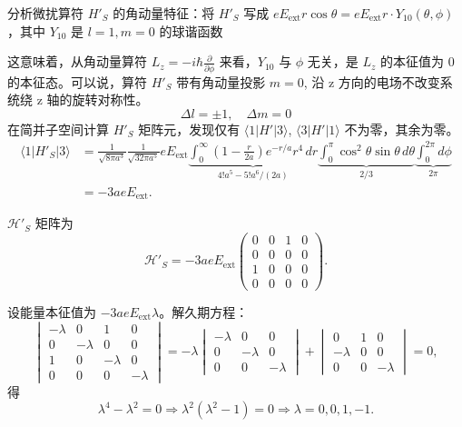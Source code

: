 分析微扰算符 \(H'_S\) 的角动量特征：将 \(H'_S\) 写成 \(eE_{\text{ext}} r \cos \theta = eE_{\text{ext}} r \cdot Y_{10}(\theta, \phi)\)，其中 \(Y_{10}\) 是 \(l=1, m=0\) 的球谐函数

这意味着，从角动量算符 \(L_z = -i\hbar \frac{\partial}{\partial \phi}\) 来看，\(Y_{10}\) 与 \(\phi\) 无关，是 \(L_z\) 的本征值为 0 的本征态。可以说，算符 \(H'_S\) 带有角动量投影 \(m=0\), 沿 z 方向的电场不改变系统绕 z 轴的旋转对称性。  
\[
\Delta l = \pm 1, \quad \Delta m = 0
\] 
在简并子空间计算 $H'_S$ 矩阵元，发现仅有 $\langle 1 | H' | 3 \rangle$, $\langle 3 | H' | 1 \rangle$ 不为零，其余为零。
\begin{align*}
	\langle 1 | H'_S | 3 \rangle &= \frac{1}{\sqrt{8\pi a^3}} \frac{1}{\sqrt{32\pi a^5}} e E_{\mathrm{ext}} \underbrace{\int_0^\infty \left(1 - \frac{r}{2a}\right) e^{-r/a} r^4 \, dr}_{4!a^5 - 5!a^6/(2a)} \underbrace{\int_0^\pi \cos^2\theta \sin\theta \, d\theta}_{2/3} \underbrace{\int_0^{2\pi} d\phi}_{2\pi} \\
	&= -3ae E_{\mathrm{ext}}.
\end{align*}

$\mathcal{H}'_S$ 矩阵为
\[
\mathcal{H}'_S = -3ae E_{\mathrm{ext}} 
\begin{pmatrix}
	0 & 0 & 1 & 0 \\
	0 & 0 & 0 & 0 \\
	1 & 0 & 0 & 0 \\
	0 & 0 & 0 & 0
\end{pmatrix}.
\]

设能量本征值为 $-3ae E_{\mathrm{ext}} \lambda$。解久期方程：
\[
\begin{vmatrix}
	-\lambda & 0 & 1 & 0 \\
	0 & -\lambda & 0 & 0 \\
	1 & 0 & -\lambda & 0 \\
	0 & 0 & 0 & -\lambda
\end{vmatrix}
= -\lambda \begin{vmatrix}
	-\lambda & 0 & 0 \\
	0 & -\lambda & 0 \\
	0 & 0 & -\lambda
\end{vmatrix}
+ \begin{vmatrix}
	0 & 1 & 0 \\
	-\lambda & 0 & 0 \\
	0 & 0 & -\lambda
\end{vmatrix}
= 0,
\]
得
\[
\lambda^4 - \lambda^2 = 0 \Rightarrow \lambda^2(\lambda^2 - 1) = 0 \Rightarrow \lambda = 0, 0, 1, -1.
\]


